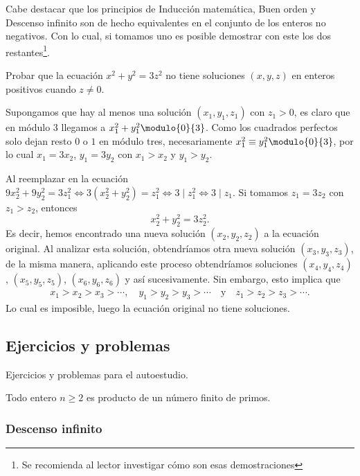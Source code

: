 Cabe destacar que los principios de Inducción matemática, Buen orden y Descenso infinito son de hecho equivalentes en
el conjunto de los enteros no negativos.
Con lo cual, si tomamos uno es posible demostrar con este los dos restantes\footnote{Se recomienda al lector investigar cómo son esas demostraciones}.

\begin{example}
    Probar que la ecuación $x^2 + y^2 = 3z^2$ no tiene soluciones $(x,y,z)$ en enteros positivos cuando $z \neq 0$.
\end{example}
\begin{solution}
    Supongamos que hay al menos una solución $(x_1,y_1,z_1)$ con $z_1 > 0$, es claro que en módulo 3 llegamos a $x_1^2+y_1^2 \modulo{0}{3}$.
    Como los cuadrados perfectos solo dejan resto $0$ o $1$ en módulo tres, necesariamente $x_1^2\equiv y_1^2 \modulo{0}{3}$,
    por lo cual $x_1 = 3x_2$, $y_1 = 3y_2$ con $x_1 > x_2$ y $y_1 > y_2$.

    Al reemplazar en la ecuación $9x_2^2+9y_2^2=3z_1^2 \iff 3(x_2^2+y_2^2)=z_1^2 \iff 3 \mid z_1^2 \iff 3 \mid z_1$.
    Si tomamos $z_1 = 3z_2$ con $z_1 > z_2$, entonces
    \[
        x_2^2+y_2^2=3z_2^2.
    \]
    Es decir, hemos encontrado una nueva solución $(x_2,y_2,z_2)$ a la ecuación original.
    Al analizar esta solución, obtendríamos otra nueva solución $(x_3,y_3,z_3)$, de la misma manera, aplicando este proceso
    obtendríamos soluciones $(x_4,y_4,z_4)$, $(x_5,y_5,z_5)$, $(x_6,y_6,z_6)$ y así sucesivamente.
    Sin embargo, esto implica que
    \begin{align*}
        x_1 > x_2 > x_3 > \cdots, \quad
        y_1 > y_2 > y_3 > \cdots \quad \text{y} \quad
        z_1 > z_2 > z_3 > \cdots.
    \end{align*}
    Lo cual es imposible, luego la ecuación original no tiene soluciones.
\end{solution}




\subsection{Ejercicios y problemas}

Ejercicios y problemas para el autoestudio.

\begin{problem}
    Todo entero $n \geq 2$ es producto de un número finito de primos.
\end{problem}

\subsubsection{Descenso infinito}

